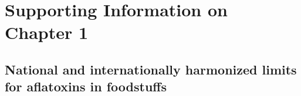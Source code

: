 \section{Supporting Information on Chapter 1} \label{Annex_chap1}



 

\subsection*{National and internationally harmonized limits for aflatoxins in foodstuffs} %

